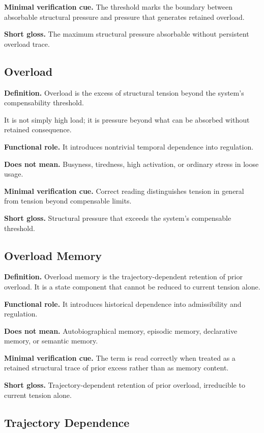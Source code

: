 \documentclass[11pt,a4paper]{article}
\begin{document}
	\textbf{Minimal verification cue.} The threshold marks the boundary between absorbable structural pressure and pressure that generates retained overload.
	
	\textbf{Short gloss.} The maximum structural pressure absorbable without persistent overload trace.
	
	\subsection{Overload}
	
	\textbf{Definition.} Overload is the excess of structural tension beyond the system's compensability threshold.
	
	It is not simply high load; it is pressure beyond what can be absorbed without retained consequence.
	
	\textbf{Functional role.} It introduces nontrivial temporal dependence into regulation.
	
	\textbf{Does not mean.} Busyness, tiredness, high activation, or ordinary stress in loose usage.
	
	\textbf{Minimal verification cue.} Correct reading distinguishes tension in general from tension beyond compensable limits.
	
	\textbf{Short gloss.} Structural pressure that exceeds the system's compensable threshold.
	
	\subsection{Overload Memory}
	
	\textbf{Definition.} Overload memory is the trajectory-dependent retention of prior overload. It is a state component that cannot be reduced to current tension alone.
	
	\textbf{Functional role.} It introduces historical dependence into admissibility and regulation.
	
	\textbf{Does not mean.} Autobiographical memory, episodic memory, declarative memory, or semantic memory.
	
	\textbf{Minimal verification cue.} The term is read correctly when treated as a retained structural trace of prior excess rather than as memory content.
	
	\textbf{Short gloss.} Trajectory-dependent retention of prior overload, irreducible to current tension alone.
	
	\subsection{Trajectory Dependence}
	
\end{document}
